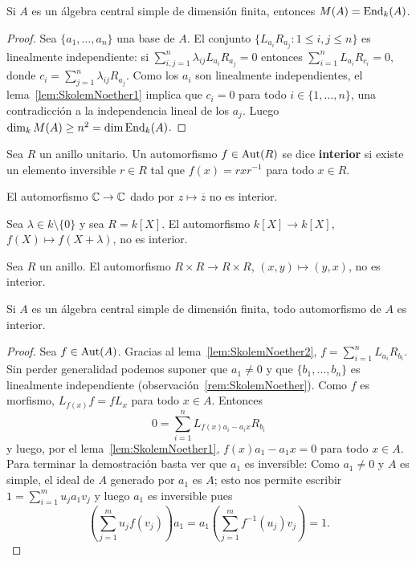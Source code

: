 \begin{lemma}
	\label{lem:SkolemNoether2}
	Si $A$ es un álgebra central simple de dimensión finita, entonces $M(A)=\operatorname{End}_k(A)$. 
\end{lemma}

\begin{proof}
	Sea $\{a_1,\dots,a_n\}$ una base de $A$. El conjunto
	$\{L_{a_i}R_{a_j}:1\leq i,j\leq n\}$ es linealmente independiente: si
	$\sum_{i,j=1}^n\lambda_{ij}L_{a_i}R_{a_j}=0$ entonces
	$\sum_{i=1}^nL_{a_i}R_{c_i}=0$, donde
	$c_i=\sum_{j=1}^n\lambda_{ij}R_{a_j}$. Como los $a_i$ son linealmente
	independientes, el lema~\ref{lem:SkolemNoether1} implica que $c_i=0$ para
	todo $i\in\{1,\dots,n\}$, una contradicción a la independencia lineal de los $a_j$.  
	Luego $\dim_kM(A)\geq n^2=\dim\operatorname{End}_k(A)$.
\end{proof}

\begin{definition}
	Sea $R$ un anillo unitario. Un automorfismo $f\in\operatorname{Aut}(R)$ se dice
	\textbf{interior} si existe un elemento inversible $r\in R$ tal que
	$f(x)=rxr^{-1}$ para todo $x\in R$.
\end{definition}

\begin{example}
	El automorfismo $\mathbb{C}\to\mathbb{C}$ dado por $z\mapsto\overline{z}$ no es interior.
\end{example}

\begin{example}
	Sea $\lambda\in k\setminus\{0\}$ y sea $R=k[X]$. El automorfismo $k[X]\to
	k[X]$, $f(X)\mapsto f(X+\lambda)$, no es interior.
\end{example}

\begin{example}
	Sea $R$ un anillo. El automorfismo $R\times R\to R\times R$, $(x,y)\mapsto
	(y,x)$, no es interior.
\end{example}

\begin{theorem}
	\label{thm:SkolemNoether}
	Si $A$ es un álgebra central simple de dimensión finita, todo automorfismo
	de $A$ es interior.
\end{theorem}

\begin{proof}	
	Sea $f\in\operatorname{Aut}(A)$. Gracias al lema~\ref{lem:SkolemNoether2}, 
	$f=\sum_{i=1}^n	L_{a_i}R_{b_i}$. 
	Sin perder generalidad podemos suponer que $a_1\ne 0$ y
	que $\{b_1,\dots,b_n\}$ es linealmente independiente
	(observación~\ref{rem:SkolemNoether}). Como $f$ es morfismo,
	$L_{f(x)}f=fL_x$ para todo $x\in A$. Entonces
	\[
		0=\sum_{i=1}^n L_{f(x)a_i-a_ix}R_{b_i}
	\]
	y luego, por el lema~\ref{lem:SkolemNoether1}, $f(x)a_1-a_1x=0$ para todo
	$x\in A$. Para terminar la demostración basta ver que $a_1$ es inversible:
	Como $a_1\ne 0$ y $A$ es simple, el ideal de $A$ generado por $a_1$ es $A$; esto nos permite escribir 
	$1=\sum_{i=1}^m u_ja_1v_j$ y luego $a_1$ es inversible pues 
	\[
		\left(\sum_{j=1}^m u_jf(v_j)\right)a_1=a_1\left(\sum_{j=1}^m f^{-1}(u_j)v_j\right)=1.
	\]
\end{proof}


